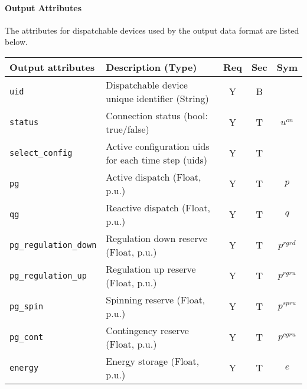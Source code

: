 \documentclass{article}
\begin{document}
\paragraph{Output Attributes} The attributes for dispatchable devices used by the output data format are listed below.
\begin{center}
\small
\begin{tabular}{ l | l | c | c | c |}
Output attributes & Description (Type) & Req & Sec & Sym\\
\hline
  {\tt uid} & Dispatchable device unique identifier (String) & Y & B & \\
  {\tt status}     & Connection status (bool: true/false) & Y & T & $u^{on}$ \\ 
  {\tt select\_config}  & Active configuration uids for each time step (uids) & Y & T & \\
  {\tt pg} & Active dispatch (Float, p.u.)  & Y & T & $p$ \\
  {\tt qg} & Reactive dispatch (Float, p.u.)& Y & T & $q$ \\
  {\tt pg\_regulation\_down} & Regulation down reserve (Float, p.u.) & Y & T & $p^{rgrd}$\\ 
  {\tt pg\_regulation\_up} & Regulation up reserve (Float, p.u.) & Y & T & $p^{rgru}$\\ 
  {\tt pg\_spin} & Spinning reserve (Float, p.u.) & Y & T & $p^{spru}$\\ 
  {\tt pg\_cont} & Contingency reserve (Float, p.u.) & Y & T & $p^{cgru}$\\     
  {\tt energy} & Energy storage (Float, p.u.) & Y & T & $e$\\     
  \hline
\end{tabular}
\end{center}

\end{document}
